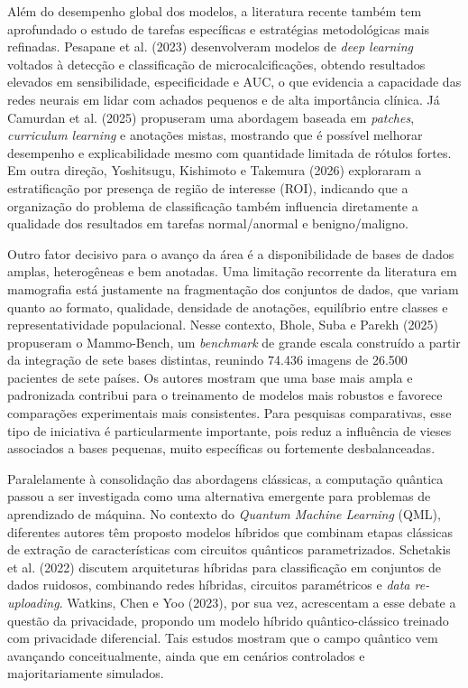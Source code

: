 \documentclass[
    12pt,
    openright,
    oneside,
    a4paper,
    english,
    brazil
]{abntex2}
\begin{document}
Além do desempenho global dos modelos, a literatura recente também tem aprofundado o estudo de tarefas específicas e estratégias metodológicas mais refinadas. Pesapane et al. (2023) desenvolveram modelos de \textit{deep learning} voltados à detecção e classificação de microcalcificações, obtendo resultados elevados em sensibilidade, especificidade e AUC, o que evidencia a capacidade das redes neurais em lidar com achados pequenos e de alta importância clínica. Já Camurdan et al. (2025) propuseram uma abordagem baseada em \textit{patches}, \textit{curriculum learning} e anotações mistas, mostrando que é possível melhorar desempenho e explicabilidade mesmo com quantidade limitada de rótulos fortes. Em outra direção, Yoshitsugu, Kishimoto e Takemura (2026) exploraram a estratificação por presença de região de interesse (ROI), indicando que a organização do problema de classificação também influencia diretamente a qualidade dos resultados em tarefas normal/anormal e benigno/maligno.

Outro fator decisivo para o avanço da área é a disponibilidade de bases de dados amplas, heterogêneas e bem anotadas. Uma limitação recorrente da literatura em mamografia está justamente na fragmentação dos conjuntos de dados, que variam quanto ao formato, qualidade, densidade de anotações, equilíbrio entre classes e representatividade populacional. Nesse contexto, Bhole, Suba e Parekh (2025) propuseram o Mammo-Bench, um \textit{benchmark} de grande escala construído a partir da integração de sete bases distintas, reunindo 74.436 imagens de 26.500 pacientes de sete países. Os autores mostram que uma base mais ampla e padronizada contribui para o treinamento de modelos mais robustos e favorece comparações experimentais mais consistentes. Para pesquisas comparativas, esse tipo de iniciativa é particularmente importante, pois reduz a influência de vieses associados a bases pequenas, muito específicas ou fortemente desbalanceadas.

Paralelamente à consolidação das abordagens clássicas, a computação quântica passou a ser investigada como uma alternativa emergente para problemas de aprendizado de máquina. No contexto do \textit{Quantum Machine Learning} (QML), diferentes autores têm proposto modelos híbridos que combinam etapas clássicas de extração de características com circuitos quânticos parametrizados. Schetakis et al. (2022) discutem arquiteturas híbridas para classificação em conjuntos de dados ruidosos, combinando redes híbridas, circuitos paramétricos e \textit{data re-uploading}. Watkins, Chen e Yoo (2023), por sua vez, acrescentam a esse debate a questão da privacidade, propondo um modelo híbrido quântico-clássico treinado com privacidade diferencial. Tais estudos mostram que o campo quântico vem avançando conceitualmente, ainda que em cenários controlados e majoritariamente simulados.
\end{document}
